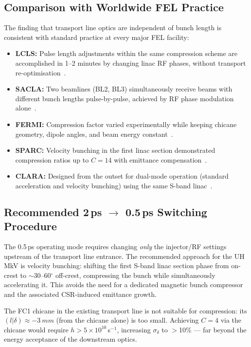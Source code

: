 \documentclass[11pt]{article}
\begin{document}
\subsection{Comparison with Worldwide FEL Practice}

The finding that transport line optics are independent of bunch length is
consistent with standard practice at every major FEL facility:
\begin{itemize}
  \item \textbf{LCLS:} Pulse length adjustments within the same
    compression scheme are accomplished in 1--2 minutes by changing
    linac RF phases, without transport re-optimisation~\cite{lcls-faq}.
  \item \textbf{SACLA:} Two beamlines (BL2, BL3) simultaneously receive
    beams with different bunch lengths pulse-by-pulse, achieved by RF
    phase modulation alone~\cite{Tono2019}.
  \item \textbf{FERMI:} Compression factor varied experimentally while
    keeping chicane geometry, dipole angles, and beam energy
    constant~\cite{DiMitri2012}.
  \item \textbf{SPARC:} Velocity bunching in the first linac section
    demonstrated compression ratios up to $C = 14$ with emittance
    compensation~\cite{Ferrario2010}.
  \item \textbf{CLARA:} Designed from the outset for dual-mode operation
    (standard acceleration and velocity bunching) using the same
    S-band linac~\cite{Snedden2024}.
\end{itemize}

\subsection{Recommended 2\,ps $\to$ 0.5\,ps Switching Procedure}

The 0.5\,ps operating mode requires changing \emph{only} the injector/RF
settings upstream of the transport line entrance.  The recommended approach
for the UH MkV is velocity bunching: shifting the first S-band linac
section phase from on-crest to $\sim$30--60$^\circ$ off-crest, compressing
the bunch while simultaneously accelerating it.  This avoids the need
for a dedicated magnetic bunch compressor and the associated CSR-induced
emittance growth.

The FC1 chicane in the existing transport line is not suitable for
compression: its $(l|\delta) \approx \SI{-3}{mm}$ (from the chicane alone) is
too small.  Achieving $C = 4$ via the chicane would require
$h > 5\times10^{10}$\,s$^{-1}$, increasing $\sigma_\delta$ to $>$10\% ---
far beyond the energy acceptance of the downstream optics.
\end{document}
